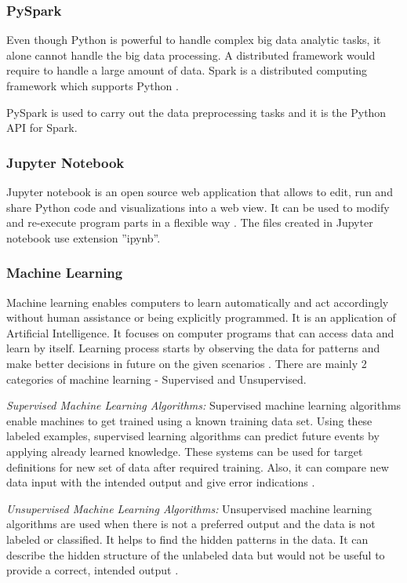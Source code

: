 \documentclass[sigconf]{acmart}
\begin{document}
\subsubsection{PySpark}

Even though Python is powerful to handle complex big data analytic tasks, it alone cannot handle the big data processing. A distributed framework would require to handle a large amount of data. Spark is a distributed computing framework which supports Python \cite{pyspark}.

PySpark is used to carry out the data preprocessing tasks and it is the Python API for Spark.

\subsubsection{Jupyter Notebook}

Jupyter notebook is an open source web application that allows to edit, run and share Python code and visualizations into a web view. It can be used to modify and re-execute program parts in a flexible way \cite{jupyter}. The files created in Jupyter notebook use extension ''ipynb''. 

\subsubsection{Machine Learning}

Machine learning enables computers to learn automatically and act accordingly without human assistance or being explicitly programmed. It is an application of Artificial Intelligence. It focuses on computer programs that can access data and learn by itself. Learning process starts by observing the data for patterns and make better decisions in future on the given scenarios \cite{machine-learning}. There are mainly 2 categories of machine learning - Supervised and Unsupervised.

\textit{Supervised Machine Learning Algorithms:} Supervised machine learning algorithms enable machines to get trained using a known training data set. Using these labeled examples, supervised learning algorithms can predict future events by applying already learned knowledge. These systems can be used for target definitions for new set of data after required training. Also, it can compare new data input with the intended output and give error indications \cite{machine-learning}. 

\textit{Unsupervised Machine Learning Algorithms:} Unsupervised machine learning algorithms are used when there is not a preferred output and the data is not labeled or classified. It helps to find the hidden patterns in the data. It can describe the hidden structure of the unlabeled data but would not be useful to provide a correct, intended output \cite{machine-learning}. 
\end{document}
